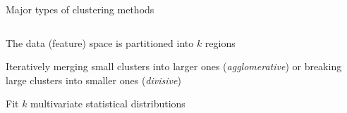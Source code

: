 \documentclass[pdf]{beamer}
\begin{document}
\begin{frame}{Major types of clustering methods}
\small
\begin{columns}
\begin{description}\addtolength{\itemsep}{3\baselineskip}
	\item<2-> [Partitional:] The data (feature) space is partitioned into $k$ regions
	\item<3-> [Hierarchical:] Iteratively merging small clusters into larger ones (\textit{agglomerative})
	or breaking large clusters into smaller ones (\textit{divisive})
	\item<4-> [Distribution-based:] Fit $k$ multivariate statistical distributions 
\end{description}
\begin{center}
	\vfill

\end{center}
\end{columns}
\end{frame}
\end{document}
